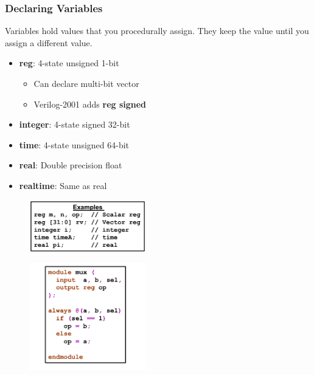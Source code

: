 \documentclass[t, notes, xcolor=table]{beamer}
\begin{document}
\begin{frame}
\frametitle{Declaring Variables}
\scriptsize{
Variables hold values that you procedurally assign. They keep the value until you assign a different value.
\begin{itemize}
\item \textbf{reg}: 4-state unsigned 1-bit
\begin{itemize}
	\item Can declare multi-bit vector
	\item Verilog-2001 adds \textbf{reg signed}
\end{itemize}
\item \textbf{integer}: 4-state signed 32-bit
\item \textbf{time}: 4-state unsigned 64-bit
\item \textbf{real}: Double precision float
\item \textbf{realtime}: Same as real
\end{itemize}
}

\begin{multicols}{2}
\begin{figure}
    \includegraphics[width=0.45\textwidth]{img/04_var0.png}
\end{figure}
\vfill
\columnbreak

\begin{figure}
    \includegraphics[width=0.45\textwidth]{img/04_var1.png}
\end{figure}
\end{multicols}
\end{frame}
\end{document}
